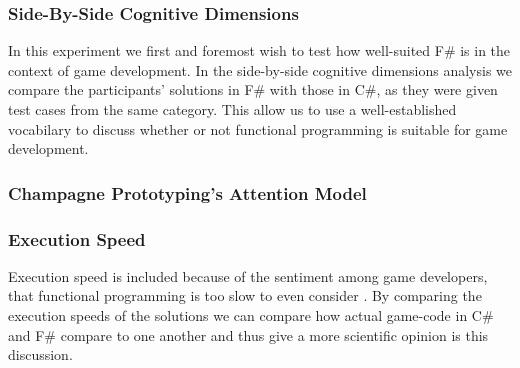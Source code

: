 \subsubsection{Side-By-Side Cognitive Dimensions}
In this experiment we first and foremost wish to test how well-suited F\# is in the context of game development. In the side-by-side cognitive dimensions analysis we compare the participants' solutions in F\# with those in C\#, as they were given test cases from the same category. This allow us to use a well-established vocabilary to discuss whether or not functional programming is suitable for game development.



\subsubsection{Champagne Prototyping's Attention Model}

\subsubsection{Execution Speed}
Execution speed is included because of the sentiment among game developers, that functional programming is too slow to even consider \cite{pop:functional:slow, pop:functional:sucks}. By comparing the execution speeds of the solutions we can compare how actual game-code in C\# and F\# compare to one another and thus give a more scientific opinion is this discussion.

